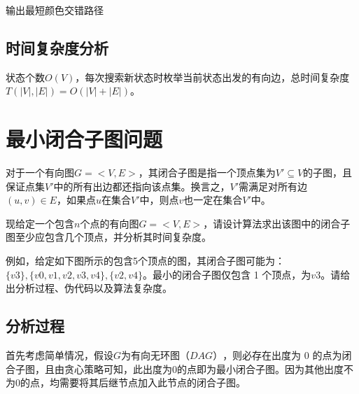 \documentclass{article}
\begin{document}
\begin{algorithm}[H]

\caption{输出最短颜色交错路径}
\LinesNumbered
{}




\end{algorithm}

\subsection{时间复杂度分析}
状态个数$O(V)$，每次搜索新状态时枚举当前状态出发的有向边，总时间复杂度$T(|V|,|E|)=O(|V|+|E|)$。


\section{最小闭合子图问题}

对于一个有向图$ G =< V, E >$，其闭合子图是指一个顶点集为$ V' \subseteq V $的子图，且保证点集$ V'$中的所有出边都还指向该点集。换言之，$ V'$需满足对所有边 $(u, v) \in E$，如果点$ u $在集合$ V'$中，则点$ v $也一定在集合$ V'$中。

现给定一个包含$ n $个点的有向图$ G =< V, E >$，请设计算法求出该图中的闭合子图至少应包含几个顶点，并分析其时间复杂度。

例如，给定如下图所示的包含5个顶点的图，其闭合子图可能为：$\{v3\}, \{v0, v1, v2, v3, v4\}, \{v2, v4\}$。最小的闭合子图仅包含 1 个顶点，为$ {v3}$。请给出分析过程、伪代码以及算法复杂度。

\subsection{分析过程}
首先考虑简单情况，假设$ G $为有向无环图$（DAG）$，则必存在出度为 0 的点为闭合子图，且由贪心策略可知，此出度为0的点即为最小闭合子图。因为其他出度不为0的点，均需要将其后继节点加入此节点的闭合子图。
\end{document}
